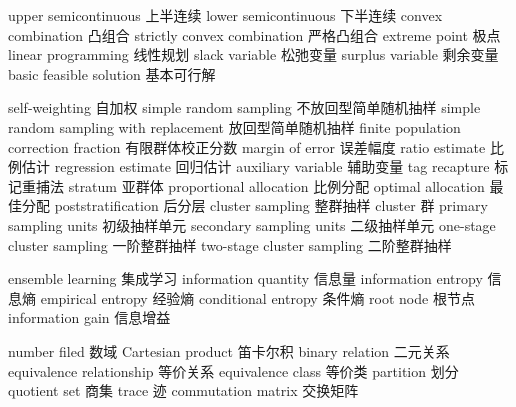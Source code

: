 {upper semicontinuous} 
{上半连续}
{lower semicontinuous} 
{下半连续}
{convex combination} 
{凸组合}
{strictly convex combination} 
{严格凸组合}
{extreme point} 
{极点}
{linear programming} 
{线性规划}
{slack variable} 
{松弛变量}
{surplus variable} 
{剩余变量}
{basic feasible solution} 
{基本可行解}


{self-weighting} 
{自加权}
{simple random sampling} 
{不放回型简单随机抽样}
{simple random sampling with replacement} 
{放回型简单随机抽样}
{finite population correction fraction} 
{有限群体校正分数}
{margin of error} 
{误差幅度}
{ratio estimate} 
{比例估计}
{regression estimate} 
{回归估计}
{auxiliary variable} 
{辅助变量}
{tag recapture} 
{标记重捕法}
{stratum} 
{亚群体}
{proportional allocation} 
{比例分配}
{optimal allocation} 
{最佳分配}
{poststratification} 
{后分层}
{cluster sampling} 
{整群抽样}
{cluster} 
{群}
{primary sampling units} 
{初级抽样单元}
{secondary sampling units} 
{二级抽样单元}
{one-stage cluster sampling} 
{一阶整群抽样}
{two-stage cluster sampling} 
{二阶整群抽样}

{ensemble learning} 
{集成学习}
{information quantity} 
{信息量}
{information entropy} 
{信息熵}
{empirical entropy} 
{经验熵}
{conditional entropy} 
{条件熵}
{root node} 
{根节点}
{information gain}
{信息增益}


{number filed} 
{数域}
{Cartesian product}
{笛卡尔积}
{binary relation} 
{二元关系}
{equivalence relationship} 
{等价关系}
{equivalence class} 
{等价类}
{partition} 
{划分}
{quotient set} 
{商集}
{trace} 
{迹}
{commutation matrix} 
{交换矩阵}